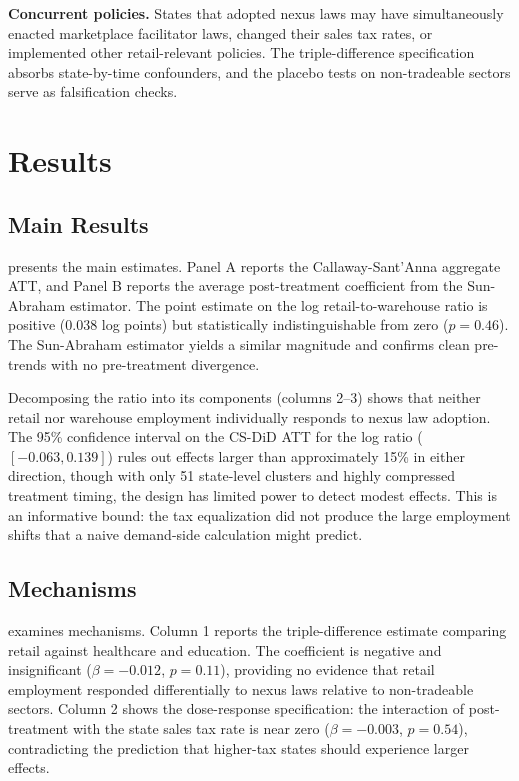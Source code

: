 \documentclass[12pt]{article}
\begin{document}
\textbf{Concurrent policies.} States that adopted nexus laws may have simultaneously enacted marketplace facilitator laws, changed their sales tax rates, or implemented other retail-relevant policies. The triple-difference specification absorbs state-by-time confounders, and the placebo tests on non-tradeable sectors serve as falsification checks.


\section{Results}
\label{sec:results}

\subsection{Main Results}



 presents the main estimates. Panel A reports the Callaway-Sant'Anna aggregate ATT, and Panel B reports the average post-treatment coefficient from the Sun-Abraham estimator. The point estimate on the log retail-to-warehouse ratio is positive (0.038 log points) but statistically indistinguishable from zero ($p = 0.46$). The Sun-Abraham estimator yields a similar magnitude and confirms clean pre-trends with no pre-treatment divergence.

Decomposing the ratio into its components (columns 2--3) shows that neither retail nor warehouse employment individually responds to nexus law adoption. The 95\% confidence interval on the CS-DiD ATT for the log ratio ($[-0.063, 0.139]$) rules out effects larger than approximately 15\% in either direction, though with only 51 state-level clusters and highly compressed treatment timing, the design has limited power to detect modest effects. This is an informative bound: the tax equalization did not produce the large employment shifts that a naive demand-side calculation might predict.

\subsection{Mechanisms}



 examines mechanisms. Column 1 reports the triple-difference estimate comparing retail against healthcare and education. The coefficient is negative and insignificant ($\beta = -0.012$, $p = 0.11$), providing no evidence that retail employment responded differentially to nexus laws relative to non-tradeable sectors. Column 2 shows the dose-response specification: the interaction of post-treatment with the state sales tax rate is near zero ($\beta = -0.003$, $p = 0.54$), contradicting the prediction that higher-tax states should experience larger effects.
\end{document}
